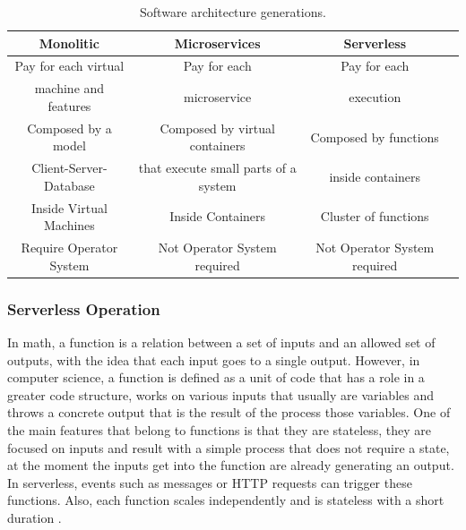 \documentclass[runningheads]{llncs}
\begin{document}
\begin{table}[htp]
  \caption{Software architecture generations.}
  \label{table:architectures}
  \centering
  \begin{tabular}{|c|c|c|c|}
  \hline
  Monolitic & Microservices & Serverless \\
  \hline
  Pay for each virtual  & Pay for each  & Pay for each \\
  machine and features & microservice & execution \\
  \hline
  Composed by a model  & Composed by virtual containers & Composed by functions \\
  Client-Server-Database & that execute small parts of a system & inside containers \\
  \hline
  Inside Virtual Machines & Inside Containers & Cluster of functions\\
  \hline
  Require Operator System & Not Operator System required & Not Operator System required\\
  \hline
  \end{tabular}
  \end{table}





\subsubsection{Serverless Operation} 
In math, a function is a relation between a set of inputs and an allowed set of
outputs, with the idea that each input goes to a single output. However, in
computer science, a function is defined as a unit of code that has a role in a
greater code structure, works on various inputs that usually are variables and
throws a concrete output that is the result of the process those variables. One
of the main features that belong to functions is that they are stateless, they
are focused on inputs and result with a simple process that does not require a
state, at the moment the inputs get into the function are already generating an
output. In serverless, events such as messages or HTTP requests can trigger
these functions. Also, each function scales independently and is stateless with
a short duration \cite{Baird2016,Cook2017}.
\end{document}

